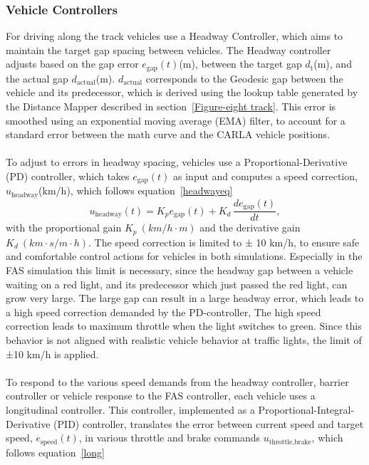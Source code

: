 \subsubsection{Vehicle Controllers}
\label{Headway Control}
For driving along the track vehicles use a Headway Controller, which aims to maintain the target gap spacing between vehicles. The Headway controller adjusts based on the gap error \(e_\text{gap}(t)\)(m), between the target gap \(d_\text{t}\)(m), and the actual gap \(d_\text{actual}\)(m). \(d_\text{actual}\) corresponds to the Geodesic gap between the vehicle and its predecessor, which is derived using the lookup table generated by the Distance Mapper described in section~\ref{Figure-eight track}. This error is smoothed using an exponential moving average (EMA) filter, to account for a standard error between the math curve and the CARLA vehicle positions. 
\\\\
To adjust to errors in headway spacing, vehicles use a Proportional-Derivative (PD) controller, which takes \(e_\text{gap}(t)\) as input and computes a speed correction, \(u_\text{headway}\)(km/h), which follows equation~\ref{headwayeq}
\begin{equation}
\label{headwayeq}
    u_\text{headway}(t) = K_pe_\text{gap}(t)+ K_d\, \frac{d e_\text{gap}(t)}{dt},
\end{equation}
with the proportional gain \(K_p\ (km/h\cdot m)\) and the derivative gain \(K_d \ (km\cdot s/ m\cdot h)\). The speed correction is limited to ± 10 km/h, to ensure safe and comfortable control actions for vehicles in both simulations. Especially in the FAS simulation this limit is necessary, since the headway gap between a vehicle waiting on a red light, and its predecessor which just passed the red light, can grow very large. The large gap can result in a large headway error, which leads to a high speed correction demanded by the PD-controller, The high speed correction leads to maximum throttle when the light switches to green. Since this behavior is not aligned with realistic vehicle behavior at traffic lights, the limit of ±10 km/h is applied. 
\\\\
To respond to the various speed demands from the headway controller, barrier controller or vehicle response to the FAS controller, each vehicle uses a longitudinal controller. This controller, implemented as a Proportional-Integral-Derivative (PID) controller, translates the error between current speed and target speed,  \(e_\text{speed}(t)\), in various throttle and brake commands \(u_\text{throttle,brake}\), which follows equation~\ref{long}
